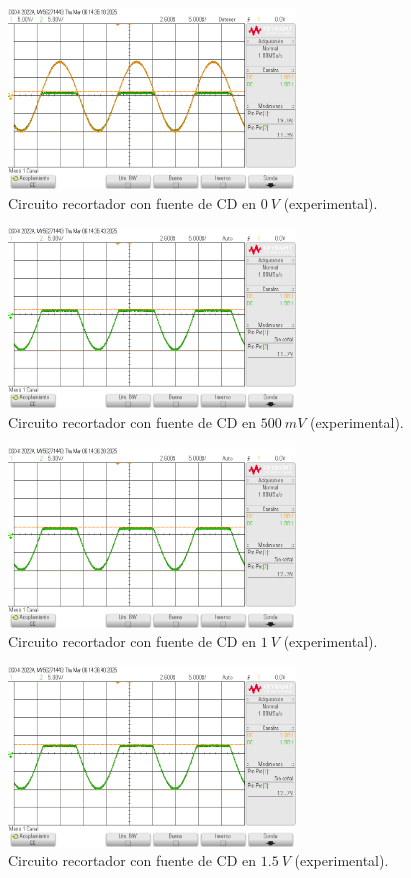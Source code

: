\documentclass[journal]{IEEEtran}
\begin{document}
\begin{figure}[H]
        \centering
        \includegraphics[width=3in]{SignalExperimental_06.png}
        \caption{Circuito recortador con fuente de CD en $0~V$ (experimental).}
        \label{fig:SignalExperimental_06}
\end{figure}
\begin{figure}[H]
        \centering
        \includegraphics[width=3in]{SignalExperimental_07.png}
        \caption{Circuito recortador con fuente de CD en $500~mV$ (experimental).}
        \label{fig:SignalExperimental_07}
\end{figure}
\begin{figure}[H]
        \centering
        \includegraphics[width=3in]{SignalExperimental_08.png}
        \caption{Circuito recortador con fuente de CD en $1~V$ (experimental).}
        \label{fig:SignalExperimental_08}
\end{figure}
\begin{figure}[H]
        \centering
        \includegraphics[width=3in]{SignalExperimental_09.png}
        \caption{Circuito recortador con fuente de CD en $1.5~V$ (experimental).}
        \label{fig:SignalExperimental_09}
\end{figure}
\end{document}
